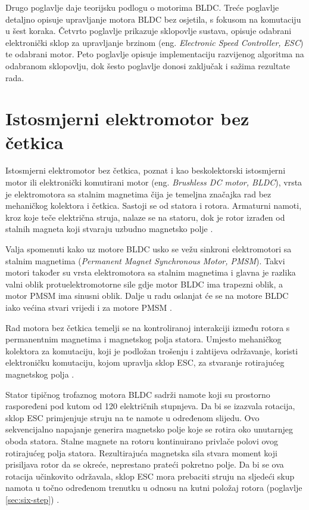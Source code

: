 \documentclass[diplomskirad]{fer}
\begin{document}
Drugo poglavlje daje teorijsku podlogu o motorima BLDC. Treće poglavlje
detaljno opisuje upravljanje motora BLDC bez osjetila, s fokusom na komutaciju
u šest koraka. Četvrto poglavlje prikazuje sklopovlje sustava, opisuje odabrani
elektronički sklop za upravljanje brzinom (eng. \textit{Electronic Speed
	Controller, ESC}) te odabrani motor. Peto poglavlje opisuje implementaciju
razvijenog algoritma na odabranom sklopovlju, dok šesto poglavlje donosi
zaključak i sažima rezultate rada.
\chapter{Istosmjerni elektromotor bez četkica}
\label{pog:bldc}

Istosmjerni elektromotor bez četkica, poznat i kao beskolektorski istosmjerni
motor ili elektronički komutirani motor (eng. \textit{Brushless DC motor,
	BLDC}), vrsta je elektromotora sa stalnim magnetima čija je temeljna značajka
rad bez mehaničkog kolektora i četkica. Sastoji se od statora i rotora.
Armaturni namoti, kroz koje teče električna struja, nalaze se na statoru, dok
je rotor izrađen od stalnih magneta koji stvaraju uzbudno magnetsko polje
\cite{elektromotor-beskolektorski}. 

Valja spomenuti kako uz motore BLDC usko se vežu sinkroni elektromotori sa
stalnim magnetima (\textit{Permanent Magnet Synchronous Motor, PMSM}). Takvi
motori također su vrsta elektromotora sa stalnim magnetima i glavna je razlika
valni oblik protuelektromotorne sile gdje motor BLDC ima trapezni oblik, a
motor PMSM ima sinusni oblik. Dalje u radu oslanjat će se na motore BLDC iako
većina stvari vrijedi i za motore PMSM
\cite{elektromotor-sa-stalnim-magnetima}.

Rad motora bez četkica temelji se na kontroliranoj interakciji između rotora s
permanentnim magnetima i magnetskog polja statora. Umjesto mehaničkog kolektora
za komutaciju, koji je podložan trošenju i zahtijeva održavanje, koristi
elektroničku komutaciju, kojom upravlja sklop ESC, za stvaranje rotirajućeg
magnetskog polja \cite{cite:disertacija}.

Stator tipičnog trofaznog motora BLDC sadrži namote koji su prostorno
raspoređeni pod kutom od 120 električnih stupnjeva. Da bi se izazvala rotacija,
sklop ESC primjenjuje struju na te namote u određenom slijedu. Ovo
sekvencijalno napajanje generira magnetsko polje koje se rotira oko unutarnjeg
oboda statora. Stalne magnete na rotoru kontinuirano privlače polovi ovog
rotirajućeg polja statora. Rezultirajuća magnetska sila stvara moment koji
prisiljava rotor da se okreće, neprestano prateći pokretno polje. Da bi se ova
rotacija učinkovito održavala, sklop ESC mora prebaciti struju na sljedeći skup
namota u točno određenom trenutku u odnosu na kutni položaj rotora (poglavlje
\ref{sec:six-step}) \cite{MicrochipAN885}.
\end{document}
